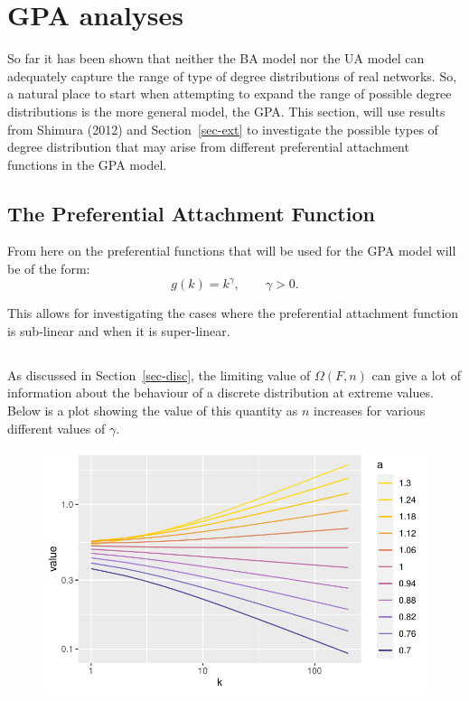 \documentclass[
  10pt,
  a4paper,
]{scrreprt}
\theoremstyle{plain}
\theoremstyle{plain}
\theoremstyle{plain}
\theoremstyle{definition}
\theoremstyle{remark}
\begin{document}
{\hypertarget{gpa-analyses}{%
\section{GPA analyses}\label{gpa-analyses}}

So far it has been shown that neither the BA model nor the UA model can
adequately capture the range of type of degree distributions of real
networks. So, a natural place to start when attempting to expand the
range of possible degree distributions is the more general model, the
GPA. This section, will use results from Shimura (2012) and
Section~\ref{sec-ext} to investigate the possible types of degree
distribution that may arise from different preferential attachment
functions in the GPA model.

\hypertarget{the-preferential-attachment-function}{%
\subsection{The Preferential Attachment
Function}\label{the-preferential-attachment-function}}

From here on the preferential functions that will be used for the GPA
model will be of the form: \[
g(k) = k^\gamma, \qquad \gamma>0.
\]

This allows for investigating the cases where the preferential
attachment function is sub-linear and when it is super-linear.

\hypertarget{section}{%
\subsection{}\label{section}}

As discussed in Section~\ref{sec-disc}, the limiting value of
\(\Omega(F,n)\) can give a lot of information about the behaviour of a
discrete distribution at extreme values. Below is a plot showing the
value of this quantity as \(n\) increases for various different values
of \(\gamma\).

\begin{figure}[H]

{\centering \includegraphics{doc_files/figure-pdf/fig-omega-1.pdf}

}
\end{figure}}
\end{document}

